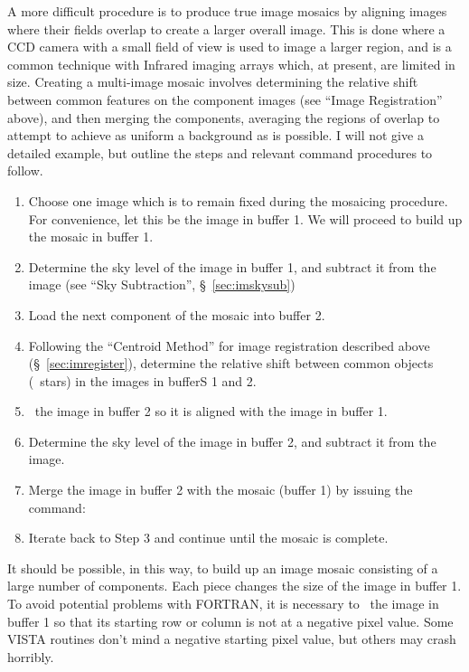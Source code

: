 A more difficult procedure is to produce true image mosaics by aligning images
where their fields overlap to create a larger overall image.  This is done
where a CCD camera with a small field of view is used to image a larger
region, and is a common technique with Infrared imaging arrays which, at
present, are limited in size.  Creating a multi-image mosaic involves
determining the relative shift between common features on the component images
(see ``Image Registration'' above), and then merging the components, averaging
the regions of overlap to attempt to achieve as uniform a background as is
possible. I will not give a detailed example, but outline the steps and
relevant command procedures to follow. 

\begin{enumerate}
      \item Choose one image which is to remain fixed during the mosaicing
            procedure.  For convenience, let this be the image in buffer 1.
            We will proceed to build up the mosaic in buffer 1.
      \item Determine the sky level of the image in buffer 1, and subtract
            it from the image (see ``Sky Subtraction'', \S~\ref{sec:imskysub})
      \item Load the next component of the mosaic into buffer 2.  
      \item Following the ``Centroid Method'' for image registration described
            above (\S~\ref{sec:imregister}), determine the relative shift 
            between common objects (\eg\ stars) in the images in bufferS 1 
            and 2.
      \item {}\ the image in buffer 2 so it is aligned with the
            image in buffer 1.
      \item Determine the sky level of the image in buffer 2, and subtract
            it from the image. 
      \item Merge the image in buffer 2 with the mosaic (buffer 1) by
            issuing the command:  
      \item Iterate back to Step 3 and continue until the mosaic is
            complete.
\end{enumerate}

It should be possible, in this way, to build up an image mosaic consisting of
a large number of components.  Each piece changes the size of the image in
buffer 1.  To avoid potential problems with FORTRAN, it is necessary to
\ the image in buffer 1 so that its starting row or column is not
at a negative pixel value.  Some VISTA routines don't mind a negative starting
pixel value, but others may crash horribly. 

